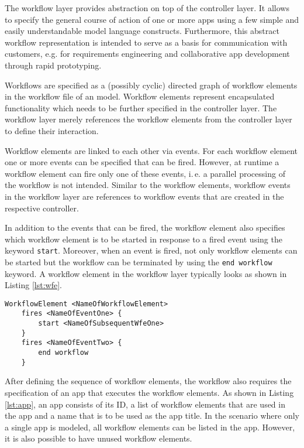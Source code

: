 
The workflow layer provides abstraction on top of the controller layer. It allows to specify the general course of action of one or more apps using a few simple and easily understandable model language constructs. Furthermore, this abstract workflow representation is intended to serve as a basis for communication with customers, e.g. for requirements engineering and collaborative app development through rapid prototyping.

Workflows are specified as a (possibly cyclic) directed graph of workflow elements in the workflow file of an \MD model. Workflow elements represent encapsulated functionality which needs to be further specified in the controller layer. The workflow layer merely references the workflow elements from the controller layer to define their interaction.

Workflow elements are linked to each other via events. For each workflow element one or more events can be specified that can be fired. However, at runtime a workflow element can fire only one of these events, i.\,e. a parallel processing of the workflow is not intended. Similar to the workflow elements, workflow events in the workflow layer are references to workflow events that are created in the respective controller.

In addition to the events that can be fired, the workflow element also specifies which workflow element is to be started in response to a fired event using the keyword {\lstinline!start!}. Moreover, when an event is fired, not only workflow elements can be started but the workflow can be terminated by using the \lstinline!end workflow! keyword.
A workflow element in the workflow layer typically looks as shown in Listing \ref{lst:wfe}.

\begin{lstlisting}[language=MD2, label=lst:wfe, caption=Workflow Elements in the Workflow Layer]
 WorkflowElement <NameOfWorkflowElement>
 	fires <NameOfEventOne> {
		start <NameOfSubsequentWfeOne>
	}
	fires <NameOfEventTwo> {
		end workflow
	}
\end{lstlisting}

After defining the sequence of workflow elements, the workflow also requires the specification of an app that executes the workflow elements. As shown in Listing \ref{lst:app}, an app consists of its ID, a list of workflow elements that are used in the app and a name that is to be used as the app title. In the scenario where only a single app is modeled, all workflow elements can be listed in the app. However, it is also possible to have unused workflow elements.

